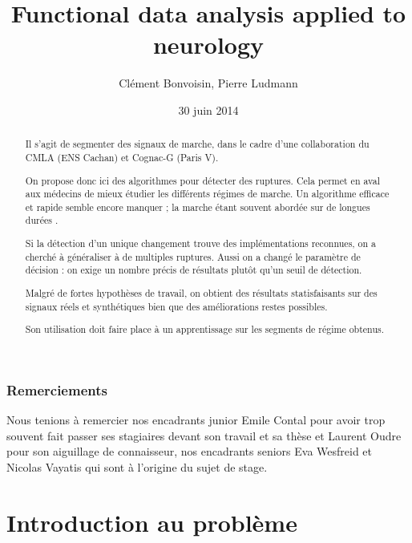 \documentclass[french,11pt,notitlepage]{report}
\begin{document}
	\title{Functional data analysis applied to neurology}
	\author{Clément Bonvoisin, Pierre Ludmann}
	\date{30 juin 2014}
	\maketitle

	\begin{abstract}
  
Il s'agit de segmenter des signaux de marche,
dans le cadre d'une collaboration du CMLA (ENS Cachan) et Cognac-G (Paris V).

On propose donc ici des algorithmes pour détecter des ruptures.
Cela permet en aval aux médecins de mieux étudier les différents régimes de marche.
Un algorithme efficace et rapide semble encore manquer ;
la marche étant souvent abordée sur de longues durées \cite{Was}.

Si la détection d'un unique changement trouve des implémentations reconnues,
on a cherché à généraliser à de multiples ruptures.
Aussi on a changé le paramètre de décision :
on exige un nombre précis de résultats plutôt qu'un seuil de détection.

Malgré de fortes hypothèses de travail,
on obtient des résultats statisfaisants sur des signaux réels et synthétiques
bien que des améliorations restes possibles.

Son utilisation doit faire place à un apprentissage sur les segments de régime obtenus.
	
	\end{abstract}

\phantom{kcahkcah}

\subsection*{Remerciements}

Nous tenions à remercier nos encadrants junior
Emile Contal pour avoir trop souvent fait passer ses stagiaires devant son travail et sa thèse et
Laurent Oudre pour son aiguillage de connaisseur,
nos encadrants seniors Eva Wesfreid et Nicolas Vayatis qui sont à l'origine du sujet de stage.




	\tableofcontents



	\chapter{Introduction au problème}
	
\end{document}
